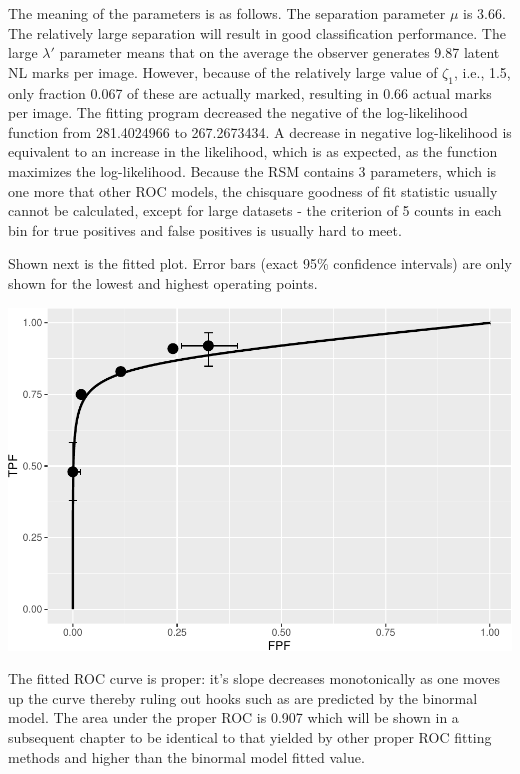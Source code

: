 \documentclass[
]{book}
\newenvironment{Shaded}{\begin{snugshade}}{\end{snugshade}}
\newcommand{\FunctionTok}[1]{\textcolor[rgb]{0.00,0.00,0.00}{#1}}
\newcommand{\NormalTok}[1]{#1}
\newcommand{\SpecialCharTok}[1]{\textcolor[rgb]{0.00,0.00,0.00}{#1}}
\begin{document}
The meaning of the parameters is as follows. The separation parameter \(\mu\) is 3.66. The relatively large separation will result in good classification performance. The large \(\lambda'\) parameter means that on the average the observer generates 9.87 latent NL marks per image. However, because of the relatively large value of \(\zeta_1\), i.e., 1.5, only fraction 0.067 of these are actually marked, resulting in 0.66 actual marks per image. The fitting program decreased the negative of the log-likelihood function from 281.4024966 to 267.2673434. A decrease in negative log-likelihood is equivalent to an increase in the likelihood, which is as expected, as the function maximizes the log-likelihood. Because the RSM contains 3 parameters, which is one more that other ROC models, the chisquare goodness of fit statistic usually cannot be calculated, except for large datasets - the criterion of 5 counts in each bin for true positives and false positives is usually hard to meet.

Shown next is the fitted plot. Error bars (exact 95\% confidence intervals) are only shown for the lowest and highest operating points.

\begin{Shaded}
\end{Shaded}

\includegraphics{19a-rsm-fitting_files/figure-latex/unnamed-chunk-2-1.pdf}

The fitted ROC curve is proper: it's slope decreases monotonically as one moves up the curve thereby ruling out hooks such as are predicted by the binormal model. The area under the proper ROC is 0.907 which will be shown in a subsequent chapter to be identical to that yielded by other proper ROC fitting methods and higher than the binormal model fitted value.
\end{document}
